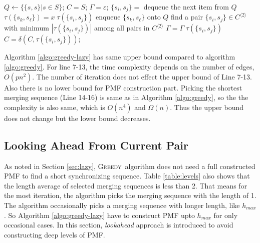 \documentclass[12pt]{article}
\newcommand{\greedyAlgo}{\textsc{Greedy}}
\begin{document}
\begin{algorithm}[ht]	
	\caption{\greedyAlgo \space Algorithm with lazy PMF construction}
	\label{algo:greedy-lazy}
	
	$Q \longleftarrow \{ \{ s,s \}| s \in S \}$; 
	$C = S$; 
	$\Gamma = \varepsilon$; 
	{
		{
			$\{ s_i, s_j \} = $ dequeue the next item from $Q$\;
			{
				{
					{
						$\tau(\{ s_k, s_\ell \}) = x \; \tau(\{ s_i, s_j\})$\;
						enqueue $\{ s_k,s_\ell \}$ onto $Q$\;
					}
				}
			} 		
		}
		find a pair $\{ s_i, s_j \} \in C^{\langle 2 \rangle}$ 
		with minimum $|\tau(\{ s_i,s_j \})|$ among all pairs 
		in $C^{\langle 2 \rangle}$\;
		$\Gamma = \Gamma \; \tau(\{ s_i, s_j \})$\;
		$C = \delta(C,\tau(\{ s_i,s_j\}))$;
	}
\end{algorithm}

Algorithm \ref{algo:greedy-lazy} has same upper bound compared to algorithm \ref{algo:greedy}. For line 7-13, the time complexity depends on the number of edges, $O(pn^2)$. The number of iteration does not effect the upper bound of Line 7-13. Also there is no lower bound for PMF construction part. Picking the shortest merging sequence (Line 14-16) is same as in Algorithm \ref{algo:greedy}, so the the complexity is also same, which is $O(n^4)$ and $\Omega(n)$. Thus the upper bound does not change but the lower bound decreases.

\subsection{Looking Ahead From Current Pair}
\label{sec:lookahead}

As noted in Section \ref{sec:lazy}, \greedyAlgo~algorithm does not need a full constructed PMF to find a short synchronizing sequence. Table \ref{table:levels} also shows that the length average of selected merging sequences is less than 2. That means for the most iteration, the algorithm picks the merging sequence with the length of 1. The algorithm occasionally picks a merging sequence with longer length, like $h_{max}$. So Algorithm \ref{algo:greedy-lazy} have to construct PMF upto $h_{max}$ for only occasional cases. In this section, \textit{lookahead} approach is introduced to avoid constructing deep levels of PMF. 
\end{document}
